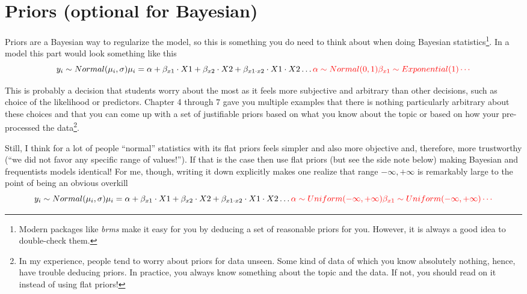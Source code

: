 \documentclass[
]{book}
\begin{document}
\hypertarget{priors-optional-for-bayesian}{%
\section{Priors (optional for Bayesian)}\label{priors-optional-for-bayesian}}

Priors are a Bayesian way to regularize the model, so this is something you do need to think about when doing Bayesian statistics\footnote{Modern packages like \emph{brms} make it easy for you by deducing a set of reasonable priors for you. However, it is always a good idea to double-check them.}. In a model this part would look something like this
\[
y_i \sim Normal(\mu_i, \sigma) \\
\mu_i = \alpha + \beta_{x1} \cdot X1 + \beta_{x2} \cdot X2 + \beta_{x1\cdot x2} \cdot X1 \cdot X2 \dotso \\
\color{red}{\alpha \sim Normal(0, 1) \\
\beta_{x1} \sim Exponential(1) \\
\cdots}
\]

This is probably a decision that students worry about the most as it feels more subjective and arbitrary than other decisions, such as choice of the likelihood or predictors. Chapter 4 through 7 gave you multiple examples that there is nothing particularly arbitrary about these choices and that you can come up with a set of justifiable priors based on what you know about the topic or based on how your pre-processed the data\footnote{In my experience, people tend to worry about priors for data unseen. Some kind of data of which you know absolutely nothing, hence, have trouble deducing priors. In practice, you always know something about the topic and the data. If not, you should read on it instead of using flat priors!}.

Still, I think for a lot of people ``normal'' statistics with its flat priors feels simpler and also more objective and, therefore, more trustworthy (``we did not favor any specific range of values!''). If that is the case then use flat priors (but see the side note below) making Bayesian and frequentists models identical! For me, though, writing it down explicitly makes one realize that range \(-\infty, +\infty\) is remarkably large to the point of being an obvious overkill
\[
y_i \sim Normal(\mu_i, \sigma) \\
\mu_i = \alpha + \beta_{x1} \cdot X1 + \beta_{x2} \cdot X2 + \beta_{x1\cdot x2} \cdot X1 \cdot X2 \dotso \\
\color{red}{\alpha \sim Uniform(-\infty, +\infty) \\
\beta_{x1} \sim Uniform(-\infty, +\infty) \\
\cdots}
\]
\end{document}
